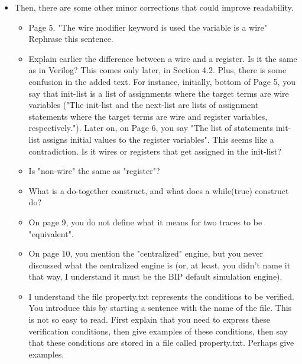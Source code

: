 \begin{itemize}
\item Then, there are some other minor corrections that could improve readability.
\begin{itemize}
\item  Page 5. "The wire modifier keyword is used the variable is a wire"
Rephrase this sentence.

\done

\item  Explain earlier the difference between a wire and a register. Is it the same
as in Verilog? This comes only later, in Section 4.2. Plus, there is some
confusion in the added text. For instance, initially, bottom of Page 5, you
say that init-list is a list of assignments where the target terms are wire
variables ("The init-list and the next-list are lists of assignment
statements where the target terms are wire and register variables,
respectively."). Later on, on Page 6, you say "The list of statements
init-list assigns initial values to the register variables". This seems like
a contradiction. Is it wires or registers that get assigned in the
init-list?

\item Is "non-wire" the same as "register"?


\item What is a do-together construct, and what does a while(true) construct do?

\item On page 9, you do not define what it means for two traces to be "equivalent".

\item On page 10, you mention the "centralized" engine, but you never discussed
what the centralized engine is (or, at least, you didn't name it that way, I
understand it must be the BIP default simulation engine).

\item I understand the file property.txt represents the conditions to be verified.
You introduce this by starting a sentence with the name of the file. This is
not so easy to read. First explain that you need to express these
verification conditions, then give examples of these conditions, then say
that these conditions are stored in a file called property.txt. Perhaps
give examples.


\end{itemize}
\end{itemize}
